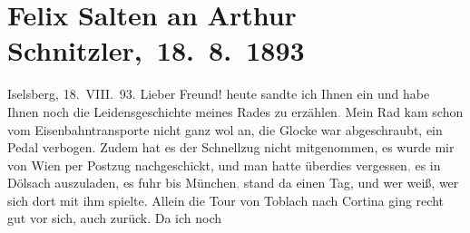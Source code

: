

         
         \renewcommand{\erwaehntePersonen}{Personen: Franz Defregger, Marie Glümer, Felix Salten, Michael Emil Salzmann, Philipp Salzmann, Theodor Salzmann, Hermine von Schaffgotsch, Josefine Lydia von Weisswasser}
         \renewcommand{\erwaehnteOrte}{Orte: Ampezzo, Cortina d'Ampezzo, Dölsach, Großglockner, Heiligenblut am Großglockner, Iselsberg, Kaiser-Franz-Josefs-Höhe, Lienz, Mittewald an der Drau, München, Pasterze Glacier, Toblach, Wien}
         \renewcommand{\erwaehnteWerke}{}
               \section[ Felix Salten an Arthur Schnitzler, 18. 8. 1893]{ Felix Salten an Arthur Schnitzler, 18. 8. 1893}\nopagebreak{}\rehead{ }\begin{ledgroupsized}[t]{13cm}\normalsize\beginnumbering{} \toendnotes[C]{\smallbreak\pagebreak[2]} 
\toendnotes[C]{\smallbreak}\pstart
           \raggedleft{}{\pb}Iselsberg, 18. VIII. 93.\pend
           \pstart
           Lieber Freund!{ }heute sandte ich Ihnen ein \label{K_L03128-1v}\label{K_L03128-1h} und habe Ihnen noch die Leidensgeschichte meines Rades zu
                  erzählen\textcolor{gray}{.} Mein Rad kam schon vom Eisenbahntransporte nicht ganz
               wol an, die Glocke war abgeschraubt, ein Pedal verbogen. Zudem hat es der Schnellzug
               nicht mitgenommen, es wurde mir von Wien per
               Postzug nachgeschickt, und man hatte überdies vergessen\textcolor{gray}{,} es in Dölsach auszuladen, es fuhr bis München\textcolor{gray}{,} stand da einen Tag, und wer weiß, wer sich dort mit ihm spielte.
               Allein die Tour von Toblach nach Cortina ging recht gut vor sich, auch zurück. Da ich noch

\end{ledgroupsized}

